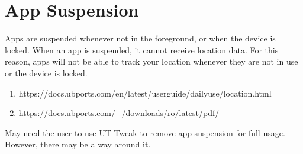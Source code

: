 \section{App Suspension}


Apps are suspended whenever not in the foreground, or when the device is locked. When an app is suspended, it cannot receive location data. For this reason, apps will not be able to track your location whenever they are not in use or the device is locked.

\begin{enumerate}
	\item https://docs.ubports.com/en/latest/userguide/dailyuse/location.html
	\item https://docs.ubports.com/\_/downloads/ro/latest/pdf/
\end{enumerate}

May need the user to use UT Tweak to remove app suspension for full usage.
However, there may be a way around it.